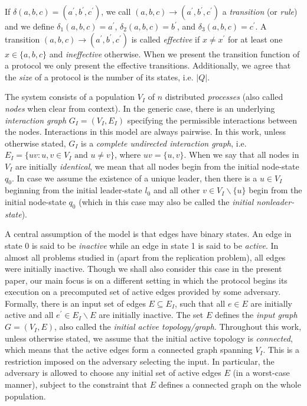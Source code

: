 \documentclass[preprint]{elsarticle}
\newcommand{\bs}{\backslash}
\begin{document}
If $\delta(a,b,c) = (a^{\prime},b^{\prime},c^{\prime})$, we call $(a,b,c) \rightarrow (a^{\prime},b^{\prime},c^{\prime})$ a \emph{transition} (or \emph{rule}) and we define $\delta_{1}(a,b,c) = a^{\prime}$, $\delta_{2}(a,b,c) = b^{\prime}$, and $\delta_{3}(a,b,c) = c^{\prime}$. A transition $(a,b,c) \rightarrow (a^{\prime},b^{\prime},c^{\prime})$ is called \emph{effective} if $x\neq x^\prime$ for at least one $x\in\{a,b,c\}$ and \emph{ineffective} otherwise. When we present the transition function of a protocol we only present the effective transitions. Additionally, we agree that the \emph{size} of a protocol is the number of its states, i.e. $|Q|$.

The system consists of a population $V_I$ of $n$ distributed \emph{processes} (also called \emph{nodes} when clear from context). In the generic case, there is an underlying \emph{interaction graph} $G_I=(V_I,E_I)$ specifying the permissible interactions between the nodes. Interactions in this model are always pairwise. In this work, unless otherwise stated, $G_I$ is a \emph{complete undirected interaction graph}, i.e. $E_I=\{uv:u,v\in V_I \text{ and } u\neq v\}$, where $uv=\{u,v\}$. When we say that all nodes in $V_I$ are initially \emph{identical}, we mean that all nodes begin from the initial node-state $q_0$. In case we assume the existence of a unique leader, then there is a $u\in V_I$ beginning from the initial leader-state $l_0$ and all other $v\in V_I\bs\{u\}$ begin from the initial node-state $q_0$ (which in this case may also be called the \emph{initial nonleader-state}).

A central assumption of the model is that edges have binary states. An edge in state 0 is said to be \emph{inactive} while an edge in state 1 is said to be \emph{active}. In almost all problems studied in \cite{MS14} (apart from the replication problem), all edges were initially inactive. Though we shall also consider this case in the present paper, our main focus is on a different setting in which the protocol begins its execution on a precomputed set of active edges provided by some adversary. Formally, there is an input set of edges $E\subseteq E_I$, such that all $e\in E$ are initially active and all $e^\prime\in E_I\bs E$ are initially inactive. The set $E$ defines the \emph{input graph} $G=(V_I,E)$, also called the \emph{initial active topology/graph}. Throughout this work, unless otherwise stated, we assume that the initial active topology is \emph{connected}, which means that the active edges form a connected graph spanning $V_I$. This is a restriction imposed on the adversary selecting the input. In particular, the adversary is allowed to choose any initial set of active edges $E$ (in a worst-case manner), subject to the constraint that $E$ defines a connected graph on the whole population. 
\end{document}
